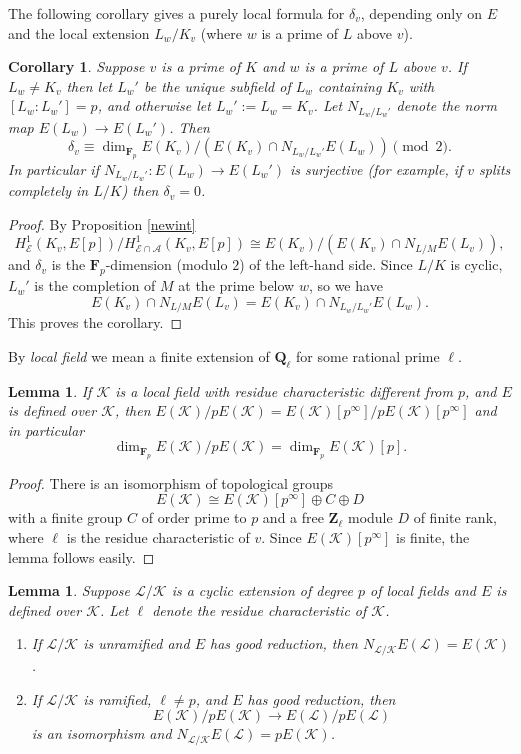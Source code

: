 \documentclass[reqno]{amsart}
\newtheorem{lem}[thm]{Lemma}
\newtheorem{cor}[thm]{Corollary}
\theoremstyle{definition}
\def\Z{\mathbf{Z}}
\def\Q{\mathbf{Q}}
\def\F{\mathbf{F}}
\def\Fp{\F_p}
\def\A{\mathcal{A}}
\def\E{\mathcal{E}}
\def\K{\mathcal{K}}
\def\L{\mathcal{L}}
\def\Hs#1{H^1_{#1}}
\def\HE{\Hs{\E}}
\def\rf{\Fp}
\begin{document}
The following corollary gives a purely local formula for $\delta_v$, depending only on 
$E$ and the local extension $L_w/K_v$ (where $w$ is a prime of $L$ above $v$).

\begin{cor}
\label{intcor}
Suppose $v$ is a prime of $K$ and $w$ is a prime of $L$ above $v$.  If $L_w \ne K_v$ 
then let $L_w'$ be the unique subfield of $L_w$ containing $K_v$ with 
$[L_w:L_w'] = p$, and otherwise let $L_w' := L_w = K_v$.  Let 
$N_{L_w/L_w'}$ denote the norm map $E(L_w) \to E(L_w')$.  
Then
$$
\delta_v \equiv \dim_{\rf}E(K_v)/(E(K_v) \cap N_{L_w/L_w'}E(L_w)) \pmod{2}.
$$
In particular if $N_{L_w/L_w'} : E(L_w) \to E(L_w')$ is surjective 
(for example, if $v$ splits completely in $L/K$) then $\delta_v = 0$.
\end{cor}

\begin{proof}
By Proposition \ref{newint} 
$$
\HE(K_v,E[p])/\Hs{\E\cap\A}(K_v,E[p]) \cong E(K_v)/(E(K_v) \cap N_{L/M}E(L_v)), 
$$
and $\delta_v$ is the $\rf$-dimension (modulo $2$) of the left-hand side.  
Since $L/K$ is cyclic, 
$L_w'$ is the completion of $M$ at the prime below $w$, so we have
$$
E(K_v) \cap N_{L/M}E(L_v) = E(K_v) \cap N_{L_w/L_w'}E(L_w).
$$
This proves the corollary.
\end{proof}

By {\em local field} we mean a finite extension of $\Q_\ell$ for some 
rational prime $\ell$.

\begin{lem}
\label{parities}
If $\K$ is a local field with residue characteristic different from $p$, 
and $E$ is defined over $\K$, 
then $E(\K)/pE(\K) = E(\K)[p^\infty]/p E(\K)[p^\infty]$ and in particular
$$
\dim_{\rf} E(\K)/p E(\K) = \dim_{\rf}E(\K)[p].
$$
\end{lem}

\begin{proof}
There is an isomorphism of topological groups
$$
E(\K) \cong E(\K)[p^\infty] \oplus C \oplus D
$$
with a finite group $C$ of order prime to $p$ and 
a free $\Z_\ell$ module $D$ of finite rank, where $\ell$ is the residue 
characteristic of $v$.  Since $E(\K)[p^\infty]$ is finite, the lemma follows easily.  
\end{proof}

\begin{lem}
\label{newnormlem}
Suppose $\L/\K$ is a cyclic extension of degree $p$ of local fields 
and $E$ is defined over $\K$.  
Let $\ell$ denote the residue characteristic of $\K$.
\begin{enumerate}
\item
If $\L/\K$ is unramified and $E$ has good reduction, 
then $N_{\L/\K}E(\L) = E(\K)$.
\item
If $\L/\K$ is ramified, $\ell \ne p$, and 
$E$ has good reduction, then 
$$
E(\K)/p E(\K) \to E(\L)/p E(\L)
$$ 
is an isomorphism and $N_{\L/\K}E(\L) = p E(\K)$.
\end{enumerate}
\end{lem}
\end{document}
